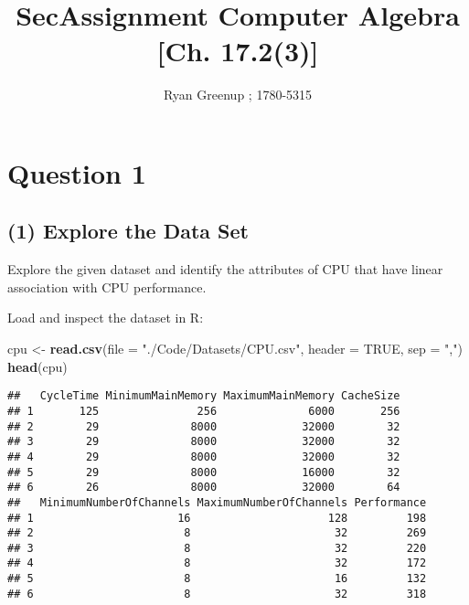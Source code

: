 \documentclass[12pt]{article}
\title{SecAssignment}
\author{}
\date{}
\title{\color{coltit} \Huge Computer Algebra [Ch. 17.2(3)]}
\author{Ryan Greenup ; 1780-5315}
\newenvironment{Shaded}{\begin{snugshade}}{\end{snugshade}}
\newcommand{\DataTypeTok}[1]{\textcolor[rgb]{0.13,0.29,0.53}{#1}}
\newcommand{\KeywordTok}[1]{\textcolor[rgb]{0.13,0.29,0.53}{\textbf{#1}}}
\newcommand{\NormalTok}[1]{#1}
\newcommand{\OtherTok}[1]{\textcolor[rgb]{0.56,0.35,0.01}{#1}}
\newcommand{\StringTok}[1]{\textcolor[rgb]{0.31,0.60,0.02}{#1}}
\begin{document}
	\maketitle
	
	{
		\setcounter{tocdepth}{2}
		\tableofcontents
	}
	
	
	


















\hypertarget{question-1}{%
\section{Question 1}\label{question-1}}

\hypertarget{explore-the-data-set}{%
\subsection{(1) Explore the Data Set}\label{explore-the-data-set}}

Explore the given dataset and identify the attributes of CPU that have
linear association with CPU performance.

Load and inspect the dataset in R:

\begin{Shaded}
\begin{Highlighting}[]
\NormalTok{cpu <-}\StringTok{ }\KeywordTok{read.csv}\NormalTok{(}\DataTypeTok{file =} \StringTok{"./Code/Datasets/CPU.csv"}\NormalTok{, }\DataTypeTok{header =} \OtherTok{TRUE}\NormalTok{, }\DataTypeTok{sep =} \StringTok{","}\NormalTok{)}
\KeywordTok{head}\NormalTok{(cpu)}
\end{Highlighting}
\end{Shaded}

\begin{verbatim}
##   CycleTime MinimumMainMemory MaximumMainMemory CacheSize
## 1       125               256              6000       256
## 2        29              8000             32000        32
## 3        29              8000             32000        32
## 4        29              8000             32000        32
## 5        29              8000             16000        32
## 6        26              8000             32000        64
##   MinimumNumberOfChannels MaximumNumberOfChannels Performance
## 1                      16                     128         198
## 2                       8                      32         269
## 3                       8                      32         220
## 4                       8                      32         172
## 5                       8                      16         132
## 6                       8                      32         318
\end{verbatim}
\end{document}
